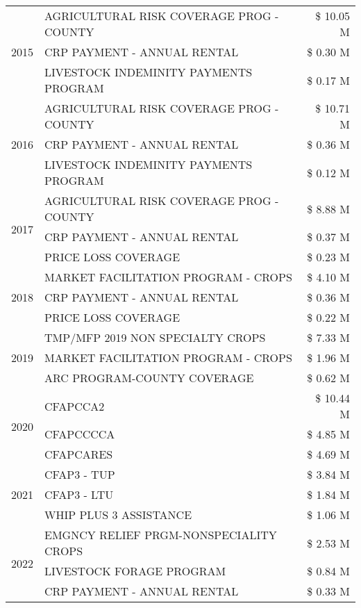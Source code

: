 \begin{tabular}{llr}
\cline{1-3}
\multirow[t]{3}{*}{2015} & AGRICULTURAL RISK COVERAGE PROG - COUNTY & \$ 10.05 M \\
 & CRP PAYMENT - ANNUAL RENTAL & \$ 0.30 M \\
 & LIVESTOCK INDEMINITY PAYMENTS PROGRAM & \$ 0.17 M \\
\cline{1-3}
\multirow[t]{3}{*}{2016} & AGRICULTURAL RISK COVERAGE PROG - COUNTY & \$ 10.71 M \\
 & CRP PAYMENT - ANNUAL RENTAL & \$ 0.36 M \\
 & LIVESTOCK INDEMINITY PAYMENTS PROGRAM & \$ 0.12 M \\
\cline{1-3}
\multirow[t]{3}{*}{2017} & AGRICULTURAL RISK COVERAGE PROG - COUNTY & \$ 8.88 M \\
 & CRP PAYMENT - ANNUAL RENTAL & \$ 0.37 M \\
 & PRICE LOSS COVERAGE & \$ 0.23 M \\
\cline{1-3}
\multirow[t]{3}{*}{2018} & MARKET FACILITATION PROGRAM - CROPS & \$ 4.10 M \\
 & CRP PAYMENT - ANNUAL RENTAL & \$ 0.36 M \\
 & PRICE LOSS COVERAGE & \$ 0.22 M \\
\cline{1-3}
\multirow[t]{3}{*}{2019} & TMP/MFP 2019 NON SPECIALTY CROPS & \$ 7.33 M \\
 & MARKET FACILITATION PROGRAM - CROPS & \$ 1.96 M \\
 & ARC PROGRAM-COUNTY COVERAGE & \$ 0.62 M \\
\cline{1-3}
\multirow[t]{3}{*}{2020} & CFAPCCA2 & \$ 10.44 M \\
 & CFAPCCCCA & \$ 4.85 M \\
 & CFAPCARES & \$ 4.69 M \\
\cline{1-3}
\multirow[t]{3}{*}{2021} & CFAP3 - TUP & \$ 3.84 M \\
 & CFAP3 - LTU & \$ 1.84 M \\
 & WHIP PLUS 3 ASSISTANCE & \$ 1.06 M \\
\cline{1-3}
\multirow[t]{3}{*}{2022} & EMGNCY RELIEF PRGM-NONSPECIALITY CROPS & \$ 2.53 M \\
 & LIVESTOCK FORAGE PROGRAM & \$ 0.84 M \\
 & CRP PAYMENT - ANNUAL RENTAL & \$ 0.33 M \\
\cline{1-3}
\bottomrule
\end{tabular}
